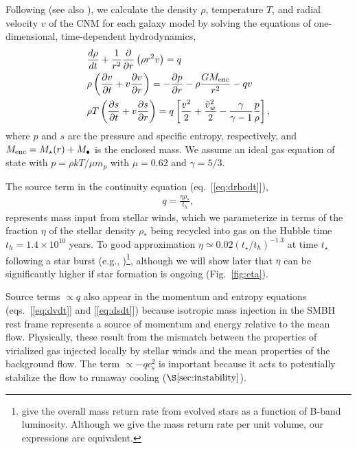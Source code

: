 \documentclass[usenatbib,fleqn]{mn2e}
\newcommand{\dxdy}[2]{\frac{d #1}{d #2} }
\newcommand{\drhodt}{\dxdy{\rho}{t}}
\newcommand{\ke}{\frac{v^2}{2}}
\newcommand{\kew}{\frac{\tilde{v}_{w}^2}{2}}
\newcommand{\gammaf}{\frac{\gamma}{\gamma-1}}
\newcommand{\cs}{\frac{p}{\rho}}
\newcommand{\rhostar}{\rho_*}
\newcommand{\Mbh}[1][]{M_{\bullet#1}}
\renewcommand{\th}{t_h}
\begin{document}
Following \citet{Quataert:2004a} (see also \citealt{HolzerAxford:1970a,De-ColleGuillochon+:2012a,ShcherbakovWong+:2014a}), we calculate the density $\rho$, temperature $T$, and radial velocity $v$ of the CNM for each galaxy model by solving the equations of one-dimensional, time-dependent hydrodynamics,
\begin{align}
  &\drhodt+\frac{1}{r^2}\frac{\partial}{\partial r}\left(\rho r^2 v\right)=q \label{eq:drhodt}\\
  &\rho \left(\frac{\partial v}{\partial t} + v\frac{\partial
      v}{\partial r}\right) =-\frac{\partial p}{\partial r}- \rho\frac{GM_{\rm enc}}{r^{2}} -q v \label{eq:dvdt}\\
  &\rho T\left(\frac{\partial s}{\partial t} + v\frac{\partial
      s}{\partial r}\right)=q\left[\ke+\kew-\gammaf \cs \right] 
, 
\label{eq:dsdt}
\end{align}
where $p$ and $s$ are the pressure and specific entropy, respectively, and $M_{\rm enc} = M_{\star}(r) + \Mbh$ is the
enclosed mass.  We assume an ideal gas equation of state with $p = \rho kT/\mu m_p$ with $\mu = 0.62$  and $\gamma = 5/3$. 

The source term in the continuity equation (eq.~[\ref{eq:drhodt}]),
\begin{align}
  q=\frac{\eta \rhostar}{\th},
\label{eq:q}
\end{align}
represents mass input from stellar winds, which we parameterize in
terms of the fraction $\eta$ of the stellar density $\rhostar$ being
recycled into gas on the Hubble time $\th = 1.4 \times 10^{10}$
years.  To good approximation $\eta\simeq 0.02 (t_{\star}/t_h)^{-1.3}$ at time $t_{\star}$ following a star burst (e.g., \citealt{Ciotti+91})\footnote{\citet{Ciotti+91} give the overall mass return rate from evolved stars as a function of B-band luminosity.  Although we give the mass return rate per unit volume, our expressions are equivalent.}, although we will show later that $\eta$ can be significantly higher if star formation is ongoing (Fig.~\ref{fig:eta}).  

Source terms $\propto q$ also appear in the momentum and entropy
equations (eqs.~[\ref{eq:dvdt}] and [\ref{eq:dsdt}]) because isotropic
mass injection in the SMBH rest frame represents a source of momentum
and energy relative to the mean flow.  Physically, these result from
the mismatch between the properties of virialized gas injected locally
by stellar winds and the mean properties of the background flow.  The
term $\propto -q c_{s}^{2}$ is important because it acts to potentially stabilize the flow to runaway cooling ($\S\ref{sec:instability}$).
\end{document}
